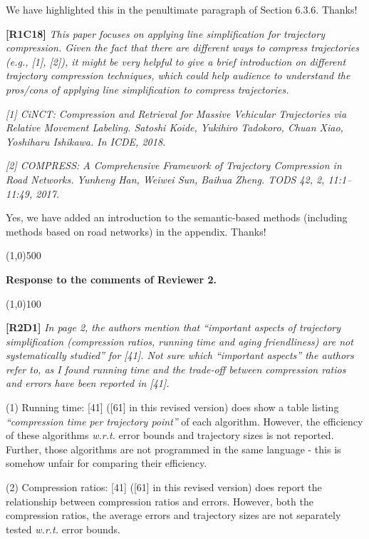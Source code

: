 \documentclass{letter}
\newcommand{\wrt}{\emph{w.r.t.}\xspace}
\begin{document}
We have highlighted this in the penultimate paragraph of Section 6.3.6.
Thanks!

\textbf{[R1C18]} \emph{ This paper focuses on applying line simplification for trajectory compression. Given the fact that there are different ways to compress trajectories (e.g., [1], [2]), it might be very helpful to give a brief introduction on different trajectory compression techniques, which could help audience to understand the pros/cons of applying line simplification to compress trajectories. }

\emph{ [1] CiNCT: Compression and Retrieval for Massive Vehicular Trajectories via Relative Movement Labeling. Satoshi Koide, Yukihiro Tadokoro, Chuan Xiao, Yoshiharu Ishikawa. In ICDE, 2018.}

\emph{ [2] COMPRESS: A Comprehensive Framework of Trajectory Compression in Road Networks. Yunheng Han, Weiwei Sun, Baihua Zheng. TODS 42, 2, 11:1--11:49, 2017.}


{Yes, we have added an introduction to the semantic-based methods (including methods based on road networks) in the appendix. Thanks!}

\line(1,0){500}

\textbf{Response to the comments of Reviewer 2.}

\line(1,0){100}

\textbf{[R2D1]} \emph{In page 2, the authors mention that ``important aspects of trajectory simplification (compression ratios, running time and aging friendliness) are not systematically studied'' for [41]. Not sure which ``important aspects'' the authors refer to, as I found running time and the trade-off between compression ratios and errors have been reported in [41].}

(1) Running time: [41] ([61] in this revised version) does show a table listing \emph{``compression time per trajectory point''} of each algorithm.  However, the efficiency of these algorithms \wrt error bounds and trajectory sizes is not reported. Further, those algorithms are not programmed in the same language - this is somehow unfair for comparing their efficiency.

(2) Compression ratios: [41] ([61] in this revised version)  does report the relationship between compression ratios and errors. However, both the compression ratios, the average errors and trajectory sizes are not separately tested \wrt error bounds.
\end{document}
